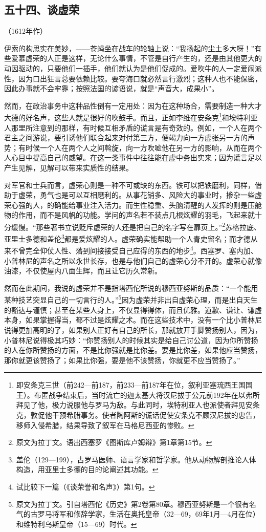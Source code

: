 \subsection*{五十四、谈虚荣}
\begin{center}
    （1612年作）
\end{center}

\par 伊索的构思实在美妙，——苍蝇坐在战车的轮轴上说：“我扬起的尘土多大呀！”有些爱慕虚荣的人正是这样，无论什么事情，不管是自行产生的，还是由其他更大的动因驱动的，只要他们一插手，他们就认为是他们促成的。爱吹牛的人一定爱闹派性，因为口出狂言总要依赖比较。要夸海口就必然言行激烈；这种人也不能保密，因此办事就不会牢靠；按照法国的谚语说，就是“声音大，成果小”。
\par 然而，在政治事务中这种品性倒有一定用处：因为在这种场合，需要制造一种大才大德的好名声，这些人就是很好的吹鼓手。而且，正如李维在安条克\footnote{即安条克三世（前242—前187，前233—前187年在位，叙利亚塞琉西王国国王）。布匿战争结束后，当时流亡的迦太基大将汉尼拔于公元前192年在以弗所拜见了他，极力说服他与罗马为敌。与此同时，埃特利亚人也派使者拜见安条克，敦促他干预希腊事务。使者陶阿斯的谎话促使安条克不顾汉尼拔的忠告，移师入侵希腊，结果导致了叙军在马格尼西亚的惨败。}和埃特利亚人那里所注意到的那样，有时候互相矛盾的谎言是有奇效的。例如，一个人在两个君主之间游说，要引诱他们联合起来对付第三方，便竭力向一方虚张另一方的声势；有时候一个人在两个人之间斡旋，向一方吹嘘他在另一方的影响，从而在两个人心目中提高自己的威望。在这一类事件中往往能在虚中务出实来；因为谎言足以产生见解，见解可以带来实质性的结果。
\par 对军官和士兵而言，虚荣心则是一种不可或缺的东西。铁可以把铁磨利，同样，借助于虚荣，勇气也是可以互相磨利的。从事花销多、风险大的事业时，掺杂一些虚荣心强的人，的确能给事业注入活力。而生性稳重、头脑清醒的人发挥的则是压舱物的作用，而不是风帆的功能。学问的声名若不装点几根炫耀的羽毛，飞起来就十分缓慢。“那些著书立说贬斥虚荣的人还是把自己的名字写在扉页上。”\footnote{原文为拉丁文。语出西塞罗《图斯库卢姆辩》第1章第15节。}苏格拉底、亚里士多德和盖伦\footnote{盖伦（129—199），古罗马医师、语言学家和哲学家。他从动物解剖推论人体构造，用亚里士多德的目的论阐述其功能。}都是爱炫耀的人。虚荣确实能帮助一个人青史留名；而才德从来不曾完全仰仗人性、落到间接接受自己应得的东西的地步\footnote{试比较下一篇（《谈荣誉和名声》）第1句。}。西塞罗、塞内加、小普林尼的声名之所以永世长存，也是与他们自己的虚荣心分不开的。虚荣心就像油漆，不仅使屋内八面生辉，而且让它历久常新。
\par 然而在此期间，我说的虚荣并不是指塔西佗所说的穆西亚努斯的品质：“一个能用某种技艺突显自己的一切言行的人。”\footnote{原文为拉丁文。引自塔西佗《历史》第2卷第80章。穆西亚努斯是一个很有名气的古罗马将军和修辞学家，生活在奥托皇帝（32—69，69年1月—4月在位）和维特利乌斯皇帝（15—69）时代。}因为虚荣并非出自虚荣心理，而是出自天生的豁达与谨慎；甚至在某些人身上，不仅显得得体，而且优雅。道歉、谦让、谦虚本身，如果掌握得当，都不过是炫耀之术。而在这些技术中，没有一个比小普林尼说得更加高明的了，如果别人正好有自己的所长，那就放开手脚赞扬别人，因为，小普林尼说得极其巧妙：“你赞扬别人的时候其实是给自己讨公道，因为你所赞扬的人在你所赞扬的方面，不是比你强就是比你差。要是比你差，如果他应当赞扬，那你就更该赞扬了；如果比你强，要是他不该赞扬，你就更不应当赞扬了。”
